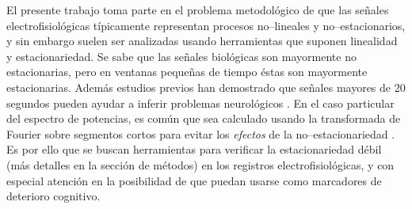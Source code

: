 
El presente trabajo toma parte en el problema metodológico de que las señales electrofisiológicas típicamente representan procesos no--lineales y no--estacionarios, y sin 
embargo suelen ser analizadas usando herramientas que suponen linealidad y estacionariedad. Se sabe que
las señales biológicas son mayormente no estacionarias, pero en ventanas pequeñas de tiempo éstas son
mayormente estacionarias.%
Además estudios previos han demostrado que señales mayores de 20 segundos pueden ayudar 
a inferir problemas neurológicos \cite{Cohen77}.
%
En el caso particular del espectro de potencias, es común que sea calculado usando la 
transformada de Fourier sobre segmentos cortos para evitar los \textit{efectos} de la 
no--estacionariedad \cite{Kaiser00}.
%
Es por ello que se buscan herramientas para verificar la estacionariedad débil (más detalles en 
la sección de métodos)  en los registros electrofisiológicas, y con especial atención en la 
posibilidad de que puedan usarse como marcadores de deterioro cognitivo.


